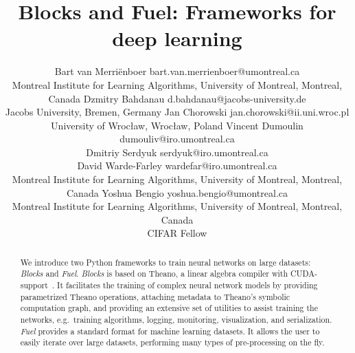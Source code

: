 \documentclass[twoside,11pt]{article}
\begin{document}
\title{Blocks and Fuel: Frameworks for deep learning}

\author{\name Bart van Merri\"{e}nboer \email bart.van.merrienboer@umontreal.ca \\
        \addr Montreal Institute for Learning Algorithms, University of Montreal, Montreal, Canada
        \AND
        \name Dzmitry Bahdanau \email d.bahdanau@jacobs-university.de \\
        \addr Jacobs University, Bremen, Germany
        \AND
        \name Jan Chorowski \email jan.chorowski@ii.uni.wroc.pl \\
        \addr University of Wroc\l aw, Wroc\l aw, Poland
        \AND
        \name Vincent Dumoulin \email dumouliv@iro.umontreal.ca \\
        \name Dmitriy Serdyuk \email serdyuk@iro.umontreal.ca \\
        \name David Warde-Farley \email wardefar@iro.umontreal.ca \\
        \addr Montreal Institute for Learning Algorithms, University of Montreal, Montreal, Canada
        \AND
        \name Yoshua Bengio \email yoshua.bengio@umontreal.ca \\
        \addr Montreal Institute for Learning Algorithms, University of Montreal, Montreal, Canada \\
        CIFAR Fellow}


\maketitle

\begin{abstract}%
  We introduce two Python frameworks to train neural networks on large
  datasets: \emph{Blocks} and \emph{Fuel}. \emph{Blocks} is based on
  Theano, a linear algebra compiler with
  CUDA-support~\citep{Bastien-Theano-2012,bergstra+al:2010-scipy}. It
  facilitates the training of complex neural network models by providing
  parametrized Theano operations, attaching metadata to Theano's symbolic
  computation graph, and providing an extensive set of utilities to assist
  training the networks, e.g.\ training algorithms, logging, monitoring,
  visualization, and serialization. \emph{Fuel} provides a standard format for
  machine learning datasets. It allows the user to easily iterate over large
  datasets, performing many types of pre-processing on the fly.
\end{abstract}
\end{document}
